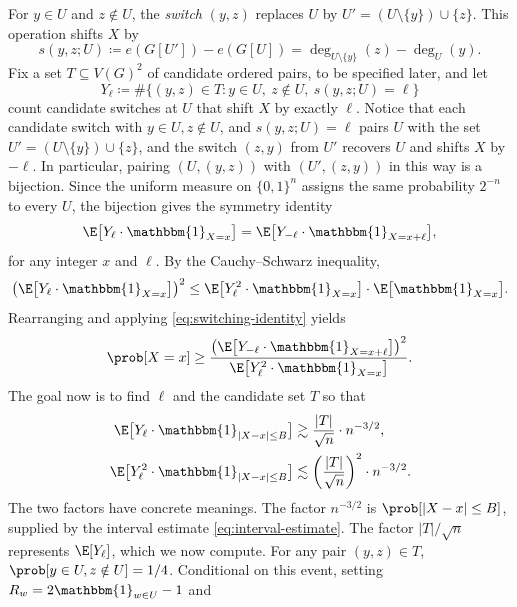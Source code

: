 For $y \in U$ and $z \notin U$, the \emph{switch} $(y, z)$ replaces $U$ by $U' = (U \setminus \{y\}) \cup \{z\}$. This operation shifts $X$ by
\[
  s(y, z; U) \coloneqq e(G[U']) - e(G[U]) = \deg_{U \setminus \{y\}}(z) - \deg_{U}(y).
\]
Fix a set $T \subseteq V(G)^2$ of candidate ordered pairs, to be specified later, and let
\[
  Y_\ell \coloneqq \#\bigl\{(y, z) \in T : y \in U,\ z \notin U,\ s(y, z; U) = \ell\bigr\}
\]
count candidate switches at $U$ that shift $X$ by exactly $\ell$. Notice that each candidate switch with $y \in U, z \notin U$, and $s(y, z; U) = \ell$ pairs $U$ with the set $U' = (U \setminus \{y\}) \cup \{z\}$, and the switch $(z, y)$ from $U'$ recovers $U$ and shifts $X$ by $-\ell$. In particular, pairing $(U, (y, z))$ with $(U', (z, y))$ in this way is a bijection. Since the uniform measure on $\{0,1\}^n$ assigns the same probability $2^{-n}$ to every $U$, the bijection gives the symmetry identity
\begin{equation}
  \label{eq:switching-identity}
  \E\bigl[Y_\ell \cdot \mathbbm{1}_{X = x}\bigr] = \E\bigl[Y_{-\ell} \cdot \mathbbm{1}_{X = x + \ell}\bigr],
\end{equation}
for any integer $x$ and $\ell$. By the Cauchy--Schwarz inequality,
\[
  \bigl(\E\bigl[Y_{\ell} \cdot \mathbbm{1}_{X = x}\bigr]\bigr)^2 \leq \E\bigl[Y_\ell^2 \cdot \mathbbm{1}_{X = x}\bigr] \cdot \E\bigl[\mathbbm{1}_{X = x}\bigr].
\]
Rearranging and applying \eqref{eq:switching-identity} yields
\begin{equation}
  \label{eq:CS-main}
  \prob[X = x] \geq \frac{\bigl(\E\bigl[Y_{-\ell} \cdot \mathbbm{1}_{X = x + \ell}\bigr]\bigr)^2}{\E\bigl[Y_\ell^2 \cdot \mathbbm{1}_{X = x}\bigr]}.
\end{equation}
The goal now is to find $\ell$ and the candidate set $T$ so that
\begin{align}
  \label{eq:moment-1}
  \E\bigl[Y_\ell \cdot \mathbbm{1}_{|X - x| \leq B}\bigr] &\gtrsim \frac{|T|}{\sqrt n} \cdot n^{-3/2}, \\
  \label{eq:moment-2}
  \E\bigl[Y_\ell^2 \cdot \mathbbm{1}_{|X - x| \leq B}\bigr] &\lesssim \left(\frac{|T|}{\sqrt n}\right)^2 \cdot n^{-3/2}.
\end{align}
The two factors have concrete meanings. The factor $n^{-3/2}$ is
$\prob[|X - x| \leq B]$, supplied by the interval estimate
\eqref{eq:interval-estimate}. The factor $|T|/\sqrt n$ represents $\E[Y_\ell]$,
which we now compute. For any pair $(y, z) \in T$,
$\prob[y \in U, z \notin U] = 1/4$. Conditional on this event, setting
$R_w = 2\mathbbm{1}_{w \in U} - 1$ and
